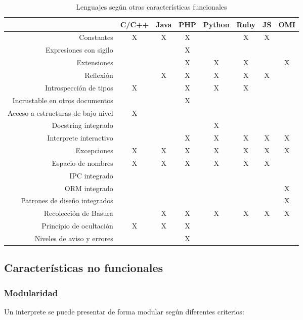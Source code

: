 \FloatBarrier
\begin{table}[h]
\begin{center}
 
\begin{tabular}{|r|c|c|c|c|c|c|c|} \hline
 & C/C++ & Java & PHP  & Python & Ruby & JS & OMI\\ \hline
Constantes & X & X & X & & X & X &  \\ \hline
Expresiones con sigilo & & & X & & & &  \\ \hline
Extensiones & & & X & X & X &   & X \\ \hline
Reflexión & & X & X & X & X & X &  \\ \hline
Introspección de tipos & X & & X & X & X & &  \\ \hline
Incrustable en otros documentos & & & X &  & & &  \\ \hline
Acceso a estructuras de bajo nivel & X &  &  &  &  &  &  \\ \hline
Docstring integrado & & &  & X &   &  &  \\ \hline
Interprete interactivo & & & X & X & X & X & X \\ \hline
Excepciones  & X & X & X & X & X & X & X \\ \hline
Espacio de nombres & X & X & X & X & X & X &  \\ \hline
IPC integrado & & &  &  &  &  &  \\ \hline
ORM integrado & & & & & & & X \\ \hline
Patrones de diseño integrados & & & & & & & X \\ \hline
Recolección de Basura & & X & X & X & X & X & X \\ \hline 
Principio de ocultación &X & X & X & & & &  \\ \hline
Niveles de aviso y errores & & & X & & & &  \\ \hline
\end{tabular}
\caption{Lenguajes según otras características funcionales}
\end{center}
\end{table}
\FloatBarrier

\subsection {Características no funcionales}
\subsubsection{Modularidad}
Un interprete se puede presentar de forma modular según diferentes criterios:

